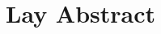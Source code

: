 \documentclass[onecolumn, compsoc,12pt]{IEEEtran}
\begin{document}

















\clearpage

\section*{Lay Abstract}
\end{document}
